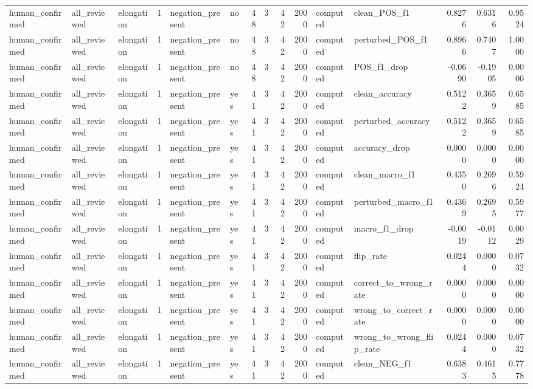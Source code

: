 \begin{tabular}{lllrllrrrrllrrr}
human_confirmed & all_reviewed & elongation & 1 & negation_present & no & 48 & 3 & 42 & 2000 & computed & clean_POS_f1 & 0.8276 & 0.6316 & 0.9524 \\
human_confirmed & all_reviewed & elongation & 1 & negation_present & no & 48 & 3 & 42 & 2000 & computed & perturbed_POS_f1 & 0.8966 & 0.7407 & 1.0000 \\
human_confirmed & all_reviewed & elongation & 1 & negation_present & no & 48 & 3 & 42 & 2000 & computed & POS_f1_drop & -0.0690 & -0.1905 & 0.0000 \\
human_confirmed & all_reviewed & elongation & 1 & negation_present & yes & 41 & 3 & 42 & 2000 & computed & clean_accuracy & 0.5122 & 0.3659 & 0.6585 \\
human_confirmed & all_reviewed & elongation & 1 & negation_present & yes & 41 & 3 & 42 & 2000 & computed & perturbed_accuracy & 0.5122 & 0.3659 & 0.6585 \\
human_confirmed & all_reviewed & elongation & 1 & negation_present & yes & 41 & 3 & 42 & 2000 & computed & accuracy_drop & 0.0000 & 0.0000 & 0.0000 \\
human_confirmed & all_reviewed & elongation & 1 & negation_present & yes & 41 & 3 & 42 & 2000 & computed & clean_macro_f1 & 0.4350 & 0.2696 & 0.5924 \\
human_confirmed & all_reviewed & elongation & 1 & negation_present & yes & 41 & 3 & 42 & 2000 & computed & perturbed_macro_f1 & 0.4369 & 0.2695 & 0.5977 \\
human_confirmed & all_reviewed & elongation & 1 & negation_present & yes & 41 & 3 & 42 & 2000 & computed & macro_f1_drop & -0.0019 & -0.0112 & 0.0029 \\
human_confirmed & all_reviewed & elongation & 1 & negation_present & yes & 41 & 3 & 42 & 2000 & computed & flip_rate & 0.0244 & 0.0000 & 0.0732 \\
human_confirmed & all_reviewed & elongation & 1 & negation_present & yes & 41 & 3 & 42 & 2000 & computed & correct_to_wrong_rate & 0.0000 & 0.0000 & 0.0000 \\
human_confirmed & all_reviewed & elongation & 1 & negation_present & yes & 41 & 3 & 42 & 2000 & computed & wrong_to_correct_rate & 0.0000 & 0.0000 & 0.0000 \\
human_confirmed & all_reviewed & elongation & 1 & negation_present & yes & 41 & 3 & 42 & 2000 & computed & wrong_to_wrong_flip_rate & 0.0244 & 0.0000 & 0.0732 \\
human_confirmed & all_reviewed & elongation & 1 & negation_present & yes & 41 & 3 & 42 & 2000 & computed & clean_NEG_f1 & 0.6383 & 0.4615 & 0.7778 \\

\end{tabular}
